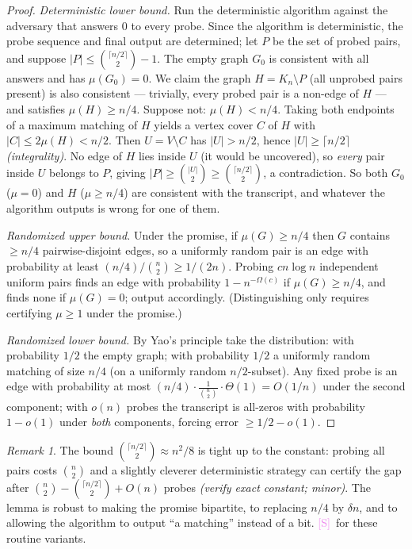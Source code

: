 \documentclass[11pt]{article}
\theoremstyle{definition}
\theoremstyle{remark}
\newtheorem{remark}[theorem]{Remark}
\newcommand{\statusS}{\textcolor{violet}{\textsf{[S]}}}
\newcommand{\mm}{\mu}
\begin{document}
\begin{proof}
\emph{Deterministic lower bound.} Run the deterministic algorithm
against the adversary that answers $0$ to every probe. Since the
algorithm is deterministic, the probe sequence and final output are
determined; let $P$ be the set of probed pairs, and suppose
$|P|\le\binom{\lceil n/2\rceil}{2}-1$. The empty graph $G_0$ is
consistent with all answers and has $\mm(G_0)=0$. We claim the graph
$H=K_n\setminus P$ (all unprobed pairs present) is also consistent ---
trivially, every probed pair is a non-edge of $H$ --- and satisfies
$\mm(H)\ge n/4$. Suppose not: $\mm(H)<n/4$. Taking both endpoints of a
maximum matching of $H$ yields a vertex cover $C$ of $H$ with
$|C|\le 2\mm(H)<n/2$. Then $U=V\setminus C$ has $|U|>n/2$, hence
$|U|\ge\lceil n/2\rceil$ \emph{(integrality)}. No edge of $H$ lies
inside $U$ (it would be uncovered), so \emph{every} pair inside $U$
belongs to $P$, giving
$|P|\ge\binom{|U|}{2}\ge\binom{\lceil n/2\rceil}{2}$, a contradiction.
So both $G_0$ ($\mm=0$) and $H$ ($\mm\ge n/4$) are consistent with the
transcript, and whatever the algorithm outputs is wrong for one of them.

\emph{Randomized upper bound.} Under the promise, if $\mm(G)\ge n/4$
then $G$ contains $\ge n/4$ pairwise-disjoint edges, so a uniformly
random pair is an edge with probability at least
$(n/4)/\binom{n}{2}\ge 1/(2n)$. Probing $cn\log n$ independent uniform
pairs finds an edge with probability $1-n^{-\Omega(c)}$ if
$\mm(G)\ge n/4$, and finds none if $\mm(G)=0$; output accordingly.
(Distinguishing only requires certifying $\mm\ge1$ under the promise.)

\emph{Randomized lower bound.} By Yao's principle take the distribution:
with probability $1/2$ the empty graph; with probability $1/2$ a
uniformly random matching of size $n/4$ (on a uniformly random
$n/2$-subset). Any fixed probe is an edge with probability at most
$(n/4)\cdot\frac{1}{\binom{n}{2}}\cdot\Theta(1)=O(1/n)$ under the second
component; with $o(n)$ probes the transcript is all-zeros with
probability $1-o(1)$ under \emph{both} components, forcing error
$\ge 1/2-o(1)$.
\end{proof}

\begin{remark}
The bound $\binom{\lceil n/2\rceil}{2}\approx n^2/8$ is tight up to the
constant: probing all pairs costs $\binom n2$ and a slightly cleverer
deterministic strategy can certify the gap after
$\binom n2-\binom{\lceil n/2\rceil}{2}+O(n)$ probes
\emph{(verify exact constant; minor)}. The lemma is robust to making
the promise bipartite, to replacing $n/4$ by $\delta n$, and to allowing
the algorithm to output ``a matching'' instead of a bit. \statusS\ for
these routine variants.
\end{remark}
\end{document}
